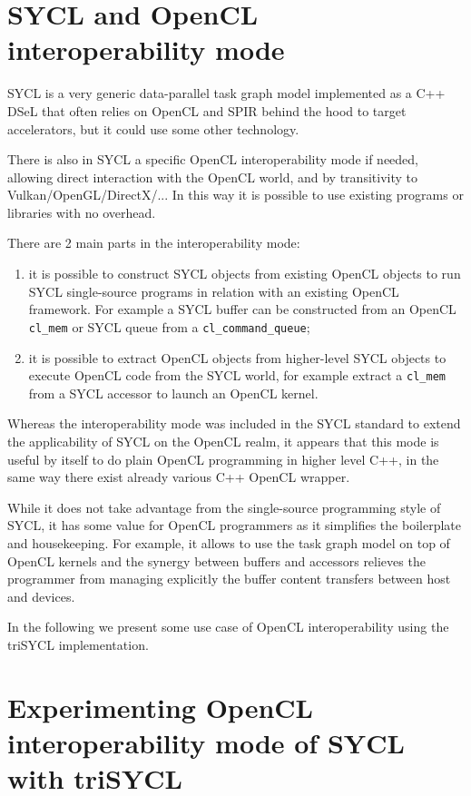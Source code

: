 \documentclass[sigplan, review]{acmart}
\begin{document}
\section{SYCL and OpenCL interoperability mode}
\label{sec:sycl-opencl-inter}

SYCL is a very generic data-parallel task graph model implemented as a
C++ DSeL that often relies on OpenCL and SPIR behind the hood to
target accelerators, but it could use some other technology.

There is also in SYCL a specific OpenCL interoperability mode if
needed, allowing direct interaction with the OpenCL world, and by
transitivity to Vulkan/OpenGL/DirectX/... In this way it is possible
to use existing programs or libraries with no overhead.

There are 2 main parts in the interoperability mode:
\begin{enumerate}
\item it is possible to construct SYCL objects from existing OpenCL
  objects to run SYCL single-source programs in relation with an
  existing OpenCL framework. For example a SYCL buffer can be
  constructed from an OpenCL \lstinline|cl_mem| or SYCL queue from a
  \lstinline|cl_command_queue|;
\item it is possible to extract OpenCL objects from higher-level SYCL
  objects to execute OpenCL code from the SYCL world, for example
  extract a \lstinline|cl_mem| from a SYCL accessor to launch an
  OpenCL kernel.
\end{enumerate}

Whereas the interoperability mode was included in the SYCL standard to
extend the applicability of SYCL on the OpenCL realm, it appears that
this mode is useful by itself to do plain OpenCL programming in higher
level C++, in the same way there exist already various C++ OpenCL
wrapper.

While it does not take advantage from the single-source programming
style of SYCL, it has some value for OpenCL programmers as it
simplifies the boilerplate and housekeeping. For example, it allows to
use the task graph model on top of OpenCL kernels and the synergy
between buffers and accessors relieves the programmer from managing
explicitly the buffer content transfers between host and devices.

In the following we present some use case of OpenCL interoperability
using the triSYCL implementation.


\section{Experimenting OpenCL interoperability mode of SYCL with
  triSYCL}
\label{sec:exper-with-opencl}
\end{document}
